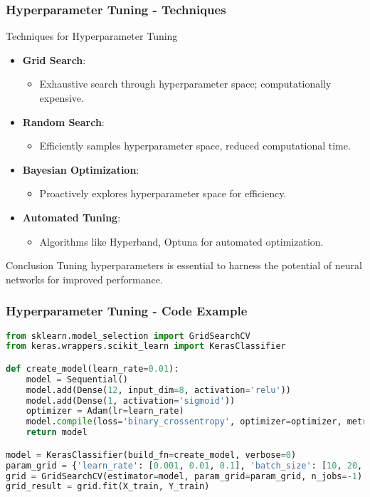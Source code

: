 \documentclass[aspectratio=169]{beamer}
\begin{document}
\begin{frame}[fragile]
  \frametitle{Hyperparameter Tuning - Techniques}
  \begin{block}{Techniques for Hyperparameter Tuning}
    \begin{itemize}
      \item \textbf{Grid Search}:
        \begin{itemize}
          \item Exhaustive search through hyperparameter space; computationally expensive.
        \end{itemize}
      \item \textbf{Random Search}:
        \begin{itemize}
          \item Efficiently samples hyperparameter space, reduced computational time.
        \end{itemize}
      \item \textbf{Bayesian Optimization}:
        \begin{itemize}
          \item Proactively explores hyperparameter space for efficiency.
        \end{itemize}
      \item \textbf{Automated Tuning}:
        \begin{itemize}
          \item Algorithms like Hyperband, Optuna for automated optimization.
        \end{itemize}
    \end{itemize}
  \end{block}

  \begin{block}{Conclusion}
    Tuning hyperparameters is essential to harness the potential of neural networks for improved performance.
  \end{block}
\end{frame}

\begin{frame}[fragile]
  \frametitle{Hyperparameter Tuning - Code Example}
  \begin{lstlisting}[language=Python]
from sklearn.model_selection import GridSearchCV
from keras.wrappers.scikit_learn import KerasClassifier

def create_model(learn_rate=0.01):
    model = Sequential()
    model.add(Dense(12, input_dim=8, activation='relu'))
    model.add(Dense(1, activation='sigmoid'))
    optimizer = Adam(lr=learn_rate)
    model.compile(loss='binary_crossentropy', optimizer=optimizer, metrics=['accuracy'])
    return model

model = KerasClassifier(build_fn=create_model, verbose=0)
param_grid = {'learn_rate': [0.001, 0.01, 0.1], 'batch_size': [10, 20, 30]}
grid = GridSearchCV(estimator=model, param_grid=param_grid, n_jobs=-1)
grid_result = grid.fit(X_train, Y_train)
  \end{lstlisting}
\end{frame}
\end{document}

